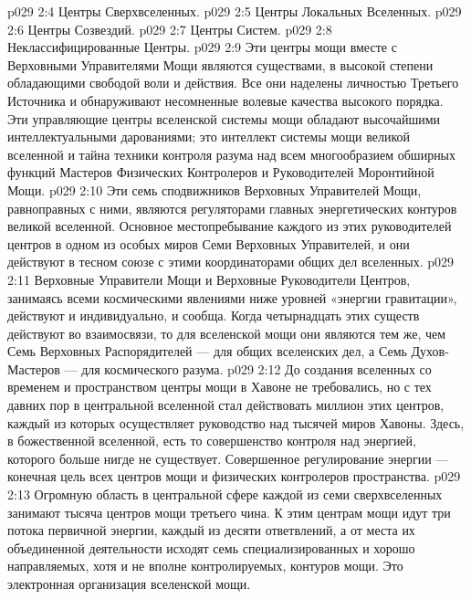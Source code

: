 \vs p029 2:4 \bibnobreakspace Центры Сверхвселенных.
\vs p029 2:5 \bibnobreakspace Центры Локальных Вселенных.
\vs p029 2:6 \bibnobreakspace Центры Созвездий.
\vs p029 2:7 \bibnobreakspace Центры Систем.
\vs p029 2:8 \bibnobreakspace Неклассифицированные Центры.
\vs p029 2:9 \pc Эти центры мощи вместе с Верховными Управителями Мощи являются существами, в высокой степени обладающими свободой воли и действия. Все они наделены личностью Третьего Источника и обнаруживают несомненные волевые качества высокого порядка. Эти управляющие центры вселенской системы мощи обладают высочайшими интеллектуальными дарованиями; это интеллект системы мощи великой вселенной и тайна техники контроля разума над всем многообразием обширных функций Мастеров Физических Контролеров и Руководителей Моронтийной Мощи.
\vs p029 2:10 \pc {}\bibnobreakspace {} Эти семь сподвижников Верховных Управителей Мощи, равноправных с ними, являются регуляторами главных энергетических контуров великой вселенной. Основное местопребывание каждого из этих руководителей центров в одном из особых миров Семи Верховных Управителей, и они действуют в тесном союзе с этими координаторами общих дел вселенных.
\vs p029 2:11 Верховные Управители Мощи и Верховные Руководители Центров, занимаясь всеми космическими явлениями ниже уровней «энергии гравитации», действуют и индивидуально, и сообща. Когда четырнадцать этих существ действуют во взаимосвязи, то для вселенской мощи они являются тем же, чем Семь Верховных Распорядителей --- для общих вселенских дел, а Семь Духов\hyp{}Мастеров --- для космического разума.
\vs p029 2:12 \pc {}\bibnobreakspace {} До создания вселенных со временем и пространством центры мощи в Хавоне не требовались, но с тех давних пор в центральной вселенной стал действовать миллион этих центров, каждый из которых осуществляет руководство над тысячей миров Хавоны. Здесь, в божественной вселенной, есть то совершенство контроля над энергией, которого больше нигде не существует. Совершенное регулирование энергии --- конечная цель всех центров мощи и физических контролеров пространства.
\vs p029 2:13 \pc {}\bibnobreakspace {} Огромную область в центральной сфере каждой из семи сверхвселенных занимают тысяча центров мощи третьего чина. К этим центрам мощи идут три потока первичной энергии, каждый из десяти ответвлений, а от места их объединенной деятельности исходят семь специализированных и хорошо направляемых, хотя и не вполне контролируемых, контуров мощи. Это электронная организация вселенской мощи.
